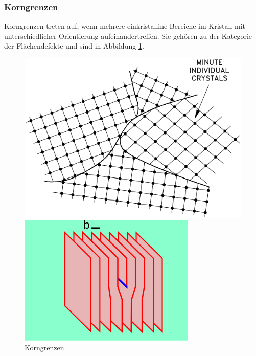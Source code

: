 \documentclass[12pt,a4paper]{scrartcl}
\numberwithin{equation}{section} %
\begin{document}
\hypertarget{korngrenzen}{
\subsubsection{Korngrenzen}\label{korngrenzen}}
Korngrenzen treten auf, wenn mehrere einkristalline Bereiche im Kristall mit unterschiedlicher Orientierung aufeinandertreffen. Sie gehören zu der Kategorie der Flächendefekte und sind in Abbildung \ref{abb:Korngrenzen}. \cite{Gross} %

\begin{figure}[ht]
	\centering
	\begin{minipage}[t]{0.3\textwidth}
		\centering
		\includegraphics[width=\textwidth]{../media/B2.5/Korngrenzen.png}
		\caption{Korngrenzen \cite{USDoE}}
		\label{abb:Korngrenzen}
	\end{minipage}
	\begin{minipage}[t]{0.3\textwidth}
		\centering
		\includegraphics[width=\textwidth]{../media/B2.5/320px-Dislocation_edge_d2.svg.png}

\end{minipage}
\end{figure}
\end{document}
